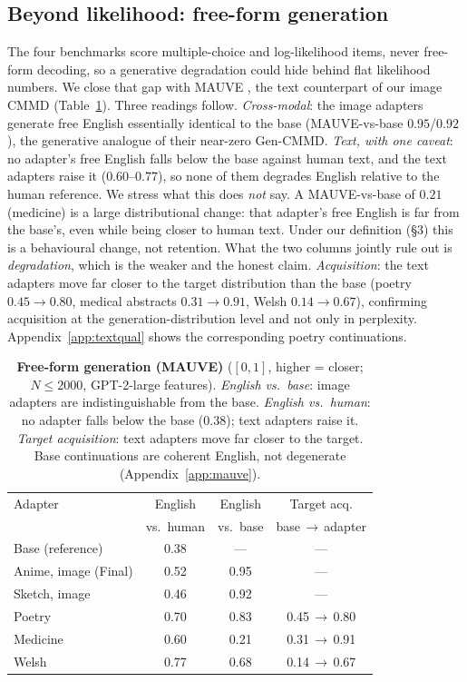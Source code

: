 \documentclass{article}
\begin{document}
\subsection{Beyond likelihood: free-form generation}
The four benchmarks score multiple-choice and log-likelihood items, never
free-form decoding, so a generative degradation could hide behind flat
likelihood numbers. We close that gap with MAUVE \citep{pillutla2021mauve}, the
text counterpart of our image CMMD (Table~\ref{tab:mauve}). Three readings
follow. \emph{Cross-modal}: the image adapters generate free English essentially
identical to the base (MAUVE-vs-base $0.95$/$0.92$), the generative analogue of
their near-zero Gen-CMMD. \emph{Text, with one caveat}: no adapter's free English
falls below the base against human text, and the text adapters raise it
($0.60$--$0.77$), so none of them degrades English relative to the human
reference. We stress what this does \emph{not} say. A MAUVE-vs-base of $0.21$
(medicine) is a large distributional change: that adapter's free English is far
from the base's, even while being closer to human text. Under our definition
(\S3) this is a behavioural change, not retention. What the two columns jointly
rule out is \emph{degradation}, which is the weaker and the honest claim.
\emph{Acquisition}: the text adapters move far closer to the target distribution
than the base (poetry $0.45\to0.80$, medical abstracts $0.31\to0.91$, Welsh
$0.14\to0.67$), confirming acquisition at the generation-distribution level and
not only in perplexity. Appendix~\ref{app:textqual} shows the corresponding
poetry continuations.

\begin{table}[t]
\caption{\textbf{Free-form generation (MAUVE)} \citep{pillutla2021mauve}
($[0,1]$, higher = closer; $N\!\le\!2000$, GPT-2-large features). \emph{English
vs.\ base}: image adapters are indistinguishable from the base. \emph{English
vs.\ human}: no adapter falls below the base ($0.38$); text adapters raise it.
\emph{Target acquisition}: text adapters move far closer to the target. Base
continuations are coherent English, not degenerate (Appendix~\ref{app:mauve}).}
\label{tab:mauve}
\centering\small
\begin{tabular}{lccc}
\toprule
Adapter & English & English & Target acq. \\
        & vs.\ human & vs.\ base & base\,$\to$\,adapter \\
\midrule
Base (reference)        & 0.38 & --- & --- \\
Anime, image (Final)    & 0.52 & 0.95 & --- \\
Sketch, image           & 0.46 & 0.92 & --- \\
Poetry                  & 0.70 & 0.83 & 0.45\,$\to$\,0.80 \\
Medicine                & 0.60 & 0.21 & 0.31\,$\to$\,0.91 \\
Welsh                   & 0.77 & 0.68 & 0.14\,$\to$\,0.67 \\
\bottomrule
\end{tabular}
\end{table}
\end{document}
